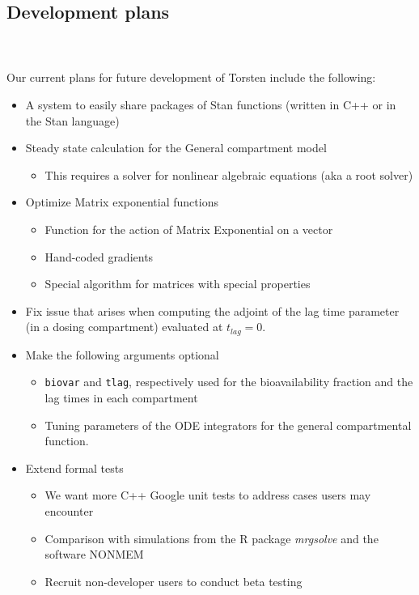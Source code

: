 \documentclass[11pt]{amsart}
\begin{document}
\subsection{Development plans} \ \\ \ \\
Our current plans for future development of Torsten include the following:
\begin{itemize}
  \item A system to easily share packages of Stan functions (written in C++ or in the Stan language)
  \item Steady state calculation for the General compartment model
  \begin{itemize}
    \item This requires a solver for nonlinear algebraic equations (aka a root solver)
  \end{itemize}
  \item Optimize Matrix exponential functions
  \begin{itemize}
    \item Function for the action of Matrix Exponential on a vector
    \item Hand-coded gradients
    \item Special algorithm for matrices with special properties
  \end{itemize}
  \item Fix issue that arises when computing the adjoint of the lag time parameter (in a dosing compartment) evaluated at $t_{lag} = 0$. 
  \item Make the following arguments optional
  \begin{itemize}
    \item \texttt{biovar} and \texttt{tlag}, respectively used for the bioavailability fraction and the lag times in each compartment
    \item Tuning parameters of the ODE integrators for the general compartmental function.
  \end{itemize}
  \item Extend formal tests
  \begin{itemize}
    \item We want more C++ Google unit tests to address cases users may encounter 
    \item Comparison with simulations from the R package \textit{mrgsolve} and the software NONMEM\textregistered
    \item Recruit non-developer users to conduct beta testing
  \end{itemize}
\end{itemize}
\end{document}
